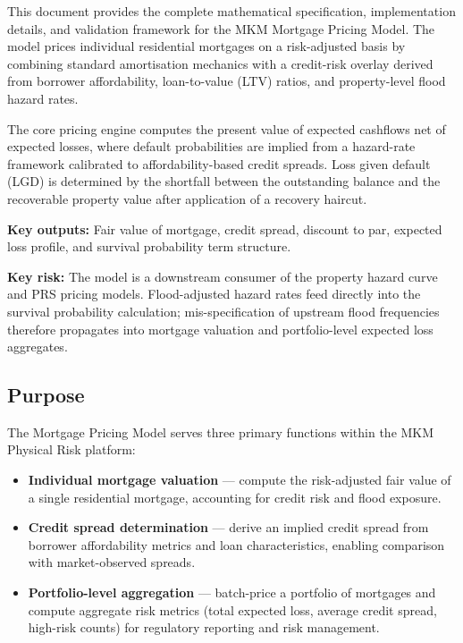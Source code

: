 \documentclass[11pt,a4paper]{article}
\begin{document}
\mkmtitlepage
\mkmlegalpage
\tableofcontents
\clearpage

\mkmexecsummary

This document provides the complete mathematical specification, implementation details,
and validation framework for the MKM Mortgage Pricing Model. The model prices individual
residential mortgages on a risk-adjusted basis by combining standard amortisation
mechanics with a credit-risk overlay derived from borrower affordability, loan-to-value
(LTV) ratios, and property-level flood hazard rates.

The core pricing engine computes the present value of expected cashflows net of expected
losses, where default probabilities are implied from a hazard-rate framework calibrated
to affordability-based credit spreads. Loss given default (LGD) is determined by the
shortfall between the outstanding balance and the recoverable property value after
application of a recovery haircut.

\textbf{Key outputs:} Fair value of mortgage, credit spread, discount to par, expected
loss profile, and survival probability term structure.

\textbf{Key risk:} The model is a downstream consumer of the property hazard curve and
PRS pricing models. Flood-adjusted hazard rates feed directly into the survival
probability calculation; mis-specification of upstream flood frequencies therefore
propagates into mortgage valuation and portfolio-level expected loss aggregates.

\mkmpurpose

\subsection{Purpose}

The Mortgage Pricing Model serves three primary functions within the MKM Physical Risk
platform:
\begin{itemize}[nosep]
    \item \textbf{Individual mortgage valuation} --- compute the risk-adjusted fair value
          of a single residential mortgage, accounting for credit risk and flood exposure.
    \item \textbf{Credit spread determination} --- derive an implied credit spread from
          borrower affordability metrics and loan characteristics, enabling comparison
          with market-observed spreads.
    \item \textbf{Portfolio-level aggregation} --- batch-price a portfolio of mortgages
          and compute aggregate risk metrics (total expected loss, average credit spread,
          high-risk counts) for regulatory reporting and risk management.
\end{itemize}
\end{document}

